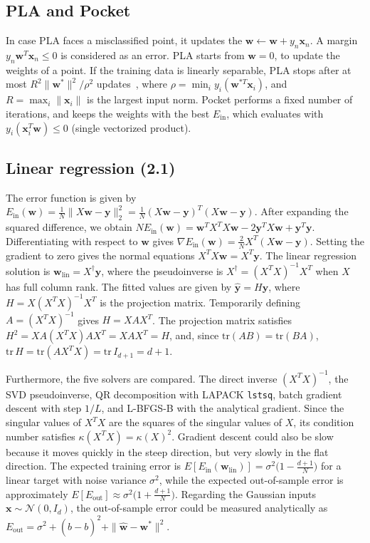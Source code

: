 \documentclass[conference]{IEEEtran}
\begin{document}
\subsection{PLA and Pocket}
In case PLA faces a misclassified point, it updates the \(\mathbf{w}\leftarrow\mathbf{w}+y_n\mathbf{x}_n\). A margin $y_n\mathbf{w}^T\mathbf{x}_n\le0$ is considered as an error. PLA starts from $\mathbf{w}=0$, to update the weights of a point. If the training data is linearly separable, PLA stops after at most \(R^2\lVert\mathbf{w}^*\rVert^2/\rho^2\) updates~\cite{lfd}, where $\rho=\min_i y_i(\mathbf{w}^{*T}\mathbf{x}_i)$, and $R=\max_i\lVert\mathbf{x}_i\rVert$ is the largest input norm. Pocket performs a fixed number of iterations, and keeps the weights with the best $E_{\mathrm{in}}$, which evaluates with $y_i(\mathbf{x}_i^T\mathbf{w})\le0$ (single vectorized product).

\subsection{Linear regression (2.1)}

The error function is given by
\(
E_{\mathrm{in}}(\mathbf{w})
=
\tfrac{1}{N}\lVert X\mathbf{w}-\mathbf{y}\rVert_2^2
=
\tfrac{1}{N}
(X\mathbf{w}-\mathbf{y})^{T}
(X\mathbf{w}-\mathbf{y})
\).
After expanding the squared difference, we obtain
\(
N E_{\mathrm{in}}(\mathbf{w})=\mathbf{w}^{T}X^{T}X\mathbf{w}
-2\mathbf{y}^{T}X\mathbf{w}
+\mathbf{y}^{T}\mathbf{y}
\).
Differentiating with respect to $\mathbf{w}$ gives
\(
\nabla E_{\mathrm{in}}(\mathbf{w})
=
\tfrac{2}{N}X^{T}(X\mathbf{w}-\mathbf{y})
\).
Setting the gradient to zero gives the normal equations
\(
X^{T}X\mathbf{w}=X^{T}\mathbf{y}
\).
The linear regression solution is
\(
\mathbf{w}_{\mathrm{lin}}=X^{\dagger}\mathbf{y}
\),
where the pseudoinverse is
\(
X^{\dagger}=(X^{T}X)^{-1}X^{T}
\)
when $X$ has full column rank.
The fitted values are given by
\(
\hat{\mathbf{y}}=H\mathbf{y}
\),
where
\(
H=X(X^{T}X)^{-1}X^{T}
\)
is the projection matrix. Temporarily defining
\(
A=(X^{T}X)^{-1}
\)
gives $H=XAX^T$. The projection matrix satisfies
\(
H^{2}=XA(X^{T}X)AX^{T}=XAX^{T}=H
\),
and, since $\mathrm{tr}(AB)=\mathrm{tr}(BA)$,
\(
\mathrm{tr}\,H=\mathrm{tr}(AX^{T}X)=\mathrm{tr}\,I_{d+1}=d+1
\).

Furthermore, the five solvers are compared. The direct inverse $(X^TX)^{-1}$, the SVD pseudoinverse, QR decomposition with LAPACK \texttt{lstsq}, batch gradient descent with step $1/L$, and L-BFGS-B with the analytical gradient. Since the singular values of $X^TX$ are the squares of the singular values of $X$, its condition number satisfies $\kappa(X^TX)=\kappa(X)^2$. Gradient descent could also be slow because it moves quickly in the steep direction, but very slowly in the flat direction. The expected training error is $E[E_{\mathrm{in}}(\mathbf{w}_{\mathrm{lin}})]=\sigma^2\big(1-\frac{d+1}{N}\big)$ for a linear target with noise variance $\sigma^2$, while the expected out-of-sample error is approximately $E[E_{\mathrm{out}}]\approx\sigma^2\big(1+\frac{d+1}{N}\big)$. Regarding the Gaussian inputs \(\mathbf{x}\sim\mathcal{N}(0,I_d)\), the out-of-sample error could be measured analytically as \(E_{\mathrm{out}}=\sigma^2+(\hat{b}-b)^2+\|\hat{\mathbf{w}}-\mathbf{w}^*\|^2\).
\end{document}
